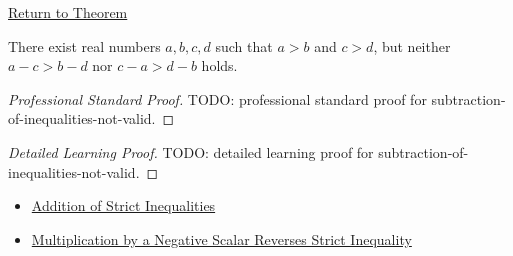 \newpage
{}
\label{prf:subtraction-of-inequalities-not-valid}

\begin{remark*}[Return]
\hyperref[prop:subtraction-of-inequalities-not-valid]{Return to Theorem}
\end{remark*}

\begin{proposition*}
There exist real numbers $a,b,c,d$ such that $a>b$ and $c>d$, but neither
$a-c>b-d$ nor $c-a>d-b$ holds.
\end{proposition*}

\begin{proof}[Professional Standard Proof]
\LRAProofBodyStart
TODO: professional standard proof for subtraction-of-inequalities-not-valid.
\end{proof}

\begin{proof}[Detailed Learning Proof]
\LRAProofBodyStart
TODO: detailed learning proof for subtraction-of-inequalities-not-valid.
\end{proof}

\begin{remark*}
\end{remark*}

\begin{dependencies}
\begin{itemize}
  \item \hyperref[thm:ineq-add-inequalities]{Addition of Strict Inequalities}
  \item \hyperref[thm:ineq-multiply-negative]{Multiplication by a Negative Scalar Reverses Strict Inequality}
\end{itemize}
\end{dependencies}

\clearpage

